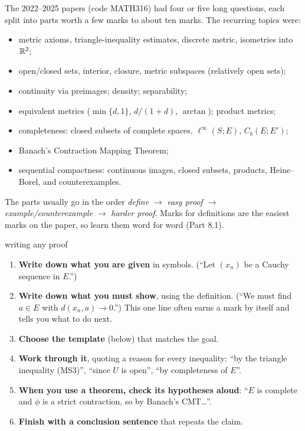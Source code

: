 The 2022--2025 papers (code MATH316) had four or five long questions, each split into parts
worth a few marks to about ten marks. The recurring topics were:
\begin{itemize}
\item metric axioms, triangle-inequality estimates, discrete metric, isometries into $\mathbb R^2$;
\item open/closed sets, interior, closure, metric subspaces (relatively open sets);
\item continuity via preimages; density; separability;
\item equivalent metrics ($\min\{d,1\}$, $d/(1+d)$, $\arctan$); product metrics;
\item completeness: closed subsets of complete spaces, $\ell^\infty(S;E)$, $C_b(E;E')$;
\item Banach's Contraction Mapping Theorem;
\item sequential compactness: continuous images, closed subsets, products, Heine--Borel,
  and counterexamples.
\end{itemize}
The parts usually go in the order \emph{define} $\to$ \emph{easy proof} $\to$
\emph{example/counterexample} $\to$ \emph{harder proof}. Marks for definitions are the easiest
marks on the paper, so learn them word for word (Part 8.1).

\begin{steps}{writing any proof}
\begin{enumerate}
\item \textbf{Write down what you are given} in symbols. (``Let $(x_n)$ be a Cauchy sequence
  in $E$.'')
\item \textbf{Write down what you must show}, using the definition. (``We must find $a\in E$
  with $d(x_n,a)\to 0$.'') This one line often earns a mark by itself and tells you what to
  do next.
\item \textbf{Choose the template} (below) that matches the goal.
\item \textbf{Work through it}, quoting a reason for every inequality: ``by the triangle
  inequality (MS3)'', ``since $U$ is open'', ``by completeness of $E$''.
\item \textbf{When you use a theorem, check its hypotheses aloud}: ``$E$ is complete and
  $\phi$ is a strict contraction, so by Banach's CMT\dots''.
\item \textbf{Finish with a conclusion sentence} that repeats the claim.
\end{enumerate}
\end{steps}

